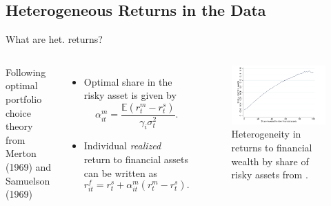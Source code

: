 \documentclass{beamer}
\begin{document}
\subsection{Heterogeneous Returns in the Data}
\begin{frame}{What are het. returns?}

   \begin{columns}
     \small
     Following optimal portfolio choice theory from Merton (1969) and Samuelson (1969)
    \centering

    \begin{itemize}
    \item Optimal share in the risky asset is given by
    $$ \alpha_{it}^{m} = \frac{\mathbb{E}(r_{t}^{m} - r_{t}^{s})}{\gamma_i \sigma^{2}_{t}}.$$
    \item Individual \textit{realized} return to financial assets can be written as
    $$ r_{it}^{f} = r_{t}^{s} + \alpha_{it}^{m} (r_{t}^{m} - r_{t}^{s}). $$
    \end{itemize}

    \centering
    \begin{figure}
    \includegraphics[width=\textwidth]{Figures/Fagereng2020Fig1.png}
    \captionsetup{font=scriptsize}
    \caption{Heterogeneity in returns to financial wealth by share of risky assets from \cite{aflgdmlp20}.}
    \end{figure}
  \end{columns}

\end{frame}
\end{document}
